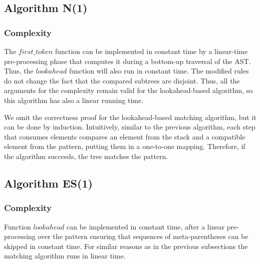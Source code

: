 \documentclass{sigplanconf}
\begin{document}

\subsection{Algorithm N(1)}
\subsubsection{Complexity}
The $first\_token$ function can be implemented in constant time by a
linear-time pre-processing phase that computes it during a bottom-up
traversal of the AST. Thus, the $lookahead$ function will also run in
constant time. The modified rules do not change the fact that the
compared subtrees are disjoint. Thus, all the arguments for the
complexity remain valid for the lookahead-based algorithm, so this
algorithm has also a linear running time.

We omit the correctness proof for the lookahead-based matching
algorithm, but it can be done by induction. Intuitively, similar to
the previous algorithm, each step that consumes elements compares an
element from the stack and a compatible element from the pattern,
putting them in a one-to-one mapping. Therefore, if the algorithm
succeeds, the tree matches the pattern.

\subsection{Algorithm ES(1)}

\subsubsection{Complexity}
Function $lookahead$ can be implemented in constant time, after a
linear pre-processing over the pattern ensuring that sequences of
meta-parentheses can be skipped in constant time. For similar reasons
as in the previous subsections the matching algorithm runs in linear
time.
\end{document}
